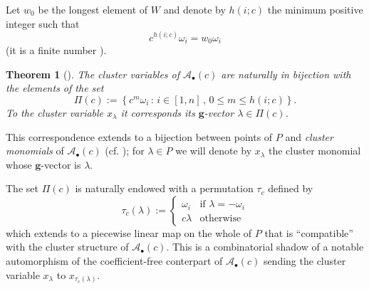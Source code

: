 \documentclass[11pt]{amsart}
\newcommand{\cA}{\mathcal{A}}
\newcommand{\bg}{\mathbf{g}}
\newtheorem{theorem}{Theorem}[section]
\theoremstyle{definition}
\numberwithin{equation}{section}
\numberwithin{figure}{section}
\begin{document}
  Let $w_0$ be the longest element of $W$ and denote by $h(i;c)$ the minimum positive integer such that 
  \[
    c^{h(i;c)}\omega_i = w_0\omega_i
  \]
  (it is a finite number \cite[Proposition 1.3]{YZ08}).
  \begin{theorem}[{\cite[Theorem 1.4]{YZ08}}]
    The cluster variables of $\cA_\bullet(c)$ are naturally in bijection with the elements of the set
    \[
      \Pi(c)
      :=
      \left\{
        c^m\omega_i \, :\, i\in[1,n] \, , \, 0\leq m \leq h(i;c) 
      \right\}.
    \]
    To the cluster variable $x_\lambda$ it corresponds its $\bg$-vector $\lambda\in\Pi(c)$.
  \end{theorem}
  This correspondence extends to a bijection between points of $P$ and \emph{cluster monomials} of $\cA_\bullet(c)$ (cf. \cite[Theorem 1.2]{Ste13}); for $\lambda\in P$ we will denote by $x_\lambda$ the cluster monomial whose $\bg$-vector is $\lambda$.

  The set $\Pi(c)$ is naturally endowed with a permutation $\tau_c$ defined by
  \[
    \tau_c (\lambda) 
    :=
    \begin{cases}
      \omega_i  & \text{if $\lambda = -\omega_i$} \\
      c\lambda  & \text{otherwise}
    \end{cases}
  \]
  which extends to a piecewise linear map on the whole of $P$ that is ``compatible'' with the cluster structure of $\cA_\bullet(c)$.
  This is a combinatorial shadow of a notable automorphism of the coefficient-free conterpart of $\cA_\bullet(c)$ sending the cluster variable $x_\lambda$ to $x_{\tau_c(\lambda)}$. 
\end{document}
